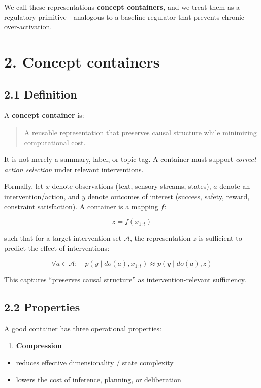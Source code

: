 \documentclass[11pt]{article}
\begin{document}
We call these representations \textbf{concept containers}, and we treat them as a regulatory primitive—analogous to a baseline regulator that prevents chronic over-activation.

\section*{2. Concept containers}

\subsection*{2.1 Definition}
A \textbf{concept container} is:

\begin{quote}
A reusable representation that preserves causal structure while minimizing computational cost.
\end{quote}

It is not merely a summary, label, or topic tag. A container must support \emph{correct action selection} under relevant interventions.

Formally, let \(x\) denote observations (text, sensory streams, states), \(a\) denote an intervention/action, and \(y\) denote outcomes of interest (success, safety, reward, constraint satisfaction). A container is a mapping \(f\):

\[
 z = f(x_{1:t})
\]

such that for a target intervention set \(\mathcal{A}\), the representation \(z\) is sufficient to predict the effect of interventions:

\[
\forall a \in \mathcal{A}:\quad p(y \mid do(a), x_{1:t}) \approx p(y \mid do(a), z)
\]

This captures “preserves causal structure” as intervention-relevant sufficiency.

\subsection*{2.2 Properties}
A good container has three operational properties:

\begin{enumerate}[label=\arabic*)]
\item \textbf{Compression}
\end{enumerate}
\begin{itemize}
\item reduces effective dimensionality / state complexity
\item lowers the cost of inference, planning, or deliberation
\end{itemize}
\end{document}
